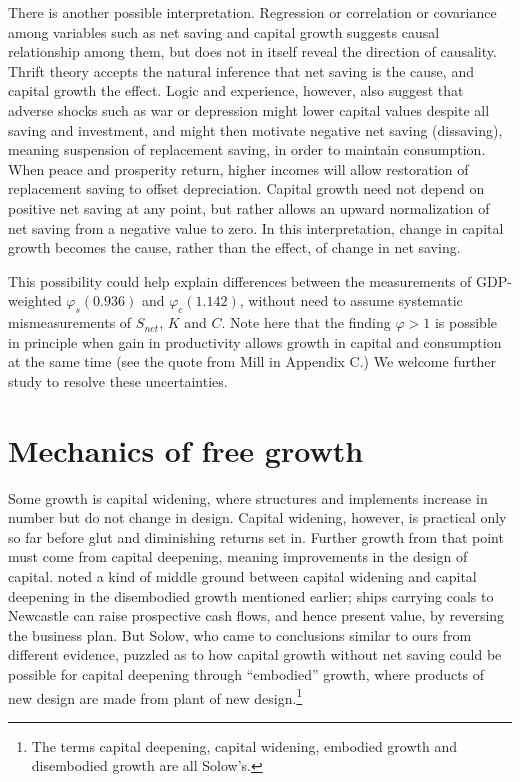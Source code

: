 \documentclass[a4paper,fleqn]{latex_styles/cas-sc}
\begin{document}
There is another possible interpretation. Regression or correlation or covariance among variables such as net saving and capital growth suggests causal relationship among them, but does not in itself reveal the direction of causality. Thrift theory accepts the natural inference that net saving is the cause, and capital growth the effect. Logic and experience, however, also suggest that adverse shocks such as war or depression might lower capital values despite all saving and investment, and might then motivate negative net saving (dissaving), meaning suspension of replacement saving, in order to maintain consumption. When peace and prosperity return, higher incomes will allow restoration of replacement saving to offset depreciation. Capital growth need not depend on positive net saving at any point, but rather allows an upward normalization of net saving from a negative value to zero. In this interpretation, change in capital growth becomes the cause, rather than the effect, of change in net saving.

This possibility could help explain differences between the measurements of GDP-weighted \(\varphi_s (0.936)\) and \(\varphi_c (1.142)\), without need to assume systematic mismeasurements of \(S_{net}\), \(K\) and \(C\). Note here that the finding \(\varphi > 1\) is possible in principle when gain in productivity allows growth in capital and consumption at the same time (see the quote from Mill in Appendix C.) We welcome further study to resolve these uncertainties.

\hypertarget{mechanics-of-free-growth}{%
\section{Mechanics of free growth}\label{mechanics-of-free-growth}}

Some growth is capital widening, where structures and implements
increase in number but do not change in design. Capital widening,
however, is practical only so far before glut and diminishing returns
set in. Further growth from that point must come from capital deepening,
meaning improvements in the design of capital.
\citet{solowContributionTheoryEconomic1956a} noted a kind of middle
ground between capital widening and capital deepening in the disembodied
growth mentioned earlier; ships carrying coals to Newcastle can raise
prospective cash flows, and hence present value, by reversing the
business plan. But Solow, who came to conclusions similar to ours from
different evidence, puzzled as to how capital growth without net
saving could be possible for capital deepening through ``embodied''
growth, where products of new design are made from plant of new
design.\footnote{The terms capital deepening, capital widening, embodied
  growth and disembodied growth are all Solow's.}
\end{document}
